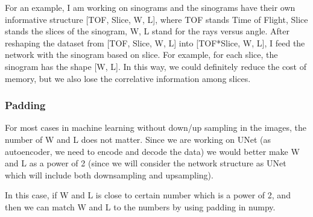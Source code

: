 \documentclass[letterpaper,10pt,english]{sphinxmanual}
\begin{document}
For an example, I am working on sinograms and the sinograms have their own informative structure {[}TOF, Slice, W, L{]}, where TOF stands Time of Flight, Slice stands the slices of the sinogram, W, L stand for the rays versus angle. After reshaping the dataset from {[}TOF, Slice, W, L{]} into {[}TOF*Slice, W, L{]},  I feed the network with the sinogram based on slice. For example, for each slice, the sinogram has the shape {[}W, L{]}. In this way, we could definitely reduce the cost of memory, but we also lose the correlative information among slices.


\subsubsection{Padding}
\label{\detokenize{usage/data:padding}}
For most cases in machine learning without down/up sampling in the images, the number of W and L does not matter. Since we are working on UNet (as autoencoder, we need to encode and decode the data) we would better make W and L as a power of 2 (since we will consider the network structure as UNet which will include both downsampling and upsampling).

In this case, if W and L is close to certain number which is a power of 2, and then we can match W and L to the numbers by using padding in numpy.
\end{document}
